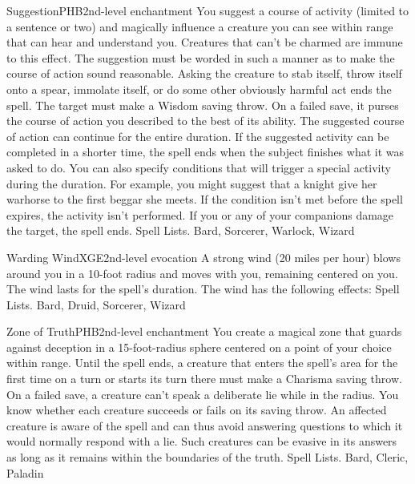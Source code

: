 \begin{spell}{Suggestion}{PHB}{2nd-level enchantment}
{
}
You suggest a course of activity (limited to a sentence or two) and magically influence a creature you can see within range that can hear and understand you. Creatures that can’t be charmed are immune to this effect. The suggestion must be worded in such a manner as to make the course of action sound reasonable. Asking the creature to stab itself, throw itself onto a spear, immolate itself, or do some other obviously harmful act ends the spell.
The target must make a Wisdom saving throw. On a failed save, it purses the course of action you described to the best of its ability. The suggested course of action can continue for the entire duration. If the suggested activity can be completed in a shorter time, the spell ends when the subject finishes what it was asked to do.
You can also specify conditions that will trigger a special activity during the duration. For example, you might suggest that a knight give her warhorse to the first beggar she meets. If the condition isn’t met before the spell expires, the activity isn’t performed.
If you or any of your companions damage the target, the spell ends.
Spell Lists. Bard, Sorcerer, Warlock, Wizard
\end{spell}

\begin{spell}{Warding Wind}{XGE}{2nd-level evocation}
{
}
A strong wind (20 miles per hour) blows around you in a 10-foot radius and moves with you, remaining centered on you. The wind lasts for the spell’s duration.
The wind has the following effects:
Spell Lists. Bard, Druid, Sorcerer, Wizard
\end{spell}

\begin{spell}{Zone of Truth}{PHB}{2nd-level enchantment}
{
}
You create a magical zone that guards against deception in a 15-foot-radius sphere centered on a point of your choice within range. Until the spell ends, a creature that enters the spell’s area for the first time on a turn or starts its turn there must make a Charisma saving throw. On a failed save, a creature can’t speak a deliberate lie while in the radius. You know whether each creature succeeds or fails on its saving throw.
An affected creature is aware of the spell and can thus avoid answering questions to which it would normally respond with a lie. Such creatures can be evasive in its answers as long as it remains within the boundaries of the truth.
Spell Lists. Bard, Cleric, Paladin
\end{spell}

